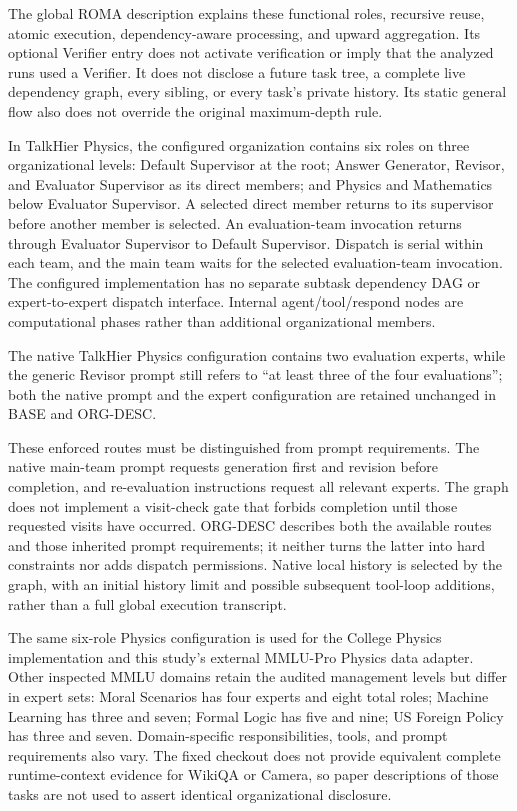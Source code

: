 \documentclass[10pt,letterpaper,twocolumn]{article}
\begin{document}
The global ROMA description explains these functional roles, recursive reuse, atomic execution, dependency-aware processing, and upward aggregation. Its optional Verifier entry does not activate verification or imply that the analyzed runs used a Verifier. It does not disclose a future task tree, a complete live dependency graph, every sibling, or every task's private history. Its static general flow also does not override the original maximum-depth rule.


In TalkHier Physics, the configured organization contains six roles on three organizational levels: Default Supervisor at the root; Answer Generator, Revisor, and Evaluator Supervisor as its direct members; and Physics and Mathematics below Evaluator Supervisor. A selected direct member returns to its supervisor before another member is selected. An evaluation-team invocation returns through Evaluator Supervisor to Default Supervisor. Dispatch is serial within each team, and the main team waits for the selected evaluation-team invocation. The configured implementation has no separate subtask dependency DAG or expert-to-expert dispatch interface. Internal agent/tool/respond nodes are computational phases rather than additional organizational members.


The native TalkHier Physics configuration contains two evaluation experts, while the generic Revisor prompt still refers to “at least three of the four evaluations”; both the native prompt and the expert configuration are retained unchanged in BASE and ORG-DESC.


These enforced routes must be distinguished from prompt requirements. The native main-team prompt requests generation first and revision before completion, and re-evaluation instructions request all relevant experts. The graph does not implement a visit-check gate that forbids completion until those requested visits have occurred. ORG-DESC describes both the available routes and those inherited prompt requirements; it neither turns the latter into hard constraints nor adds dispatch permissions. Native local history is selected by the graph, with an initial history limit and possible subsequent tool-loop additions, rather than a full global execution transcript.


The same six-role Physics configuration is used for the College Physics implementation and this study's external MMLU-Pro Physics data adapter. Other inspected MMLU domains retain the audited management levels but differ in expert sets: Moral Scenarios has four experts and eight total roles; Machine Learning has three and seven; Formal Logic has five and nine; US Foreign Policy has three and seven. Domain-specific responsibilities, tools, and prompt requirements also vary. The fixed checkout does not provide equivalent complete runtime-context evidence for WikiQA or Camera, so paper descriptions of those tasks are not used to assert identical organizational disclosure.
\end{document}

